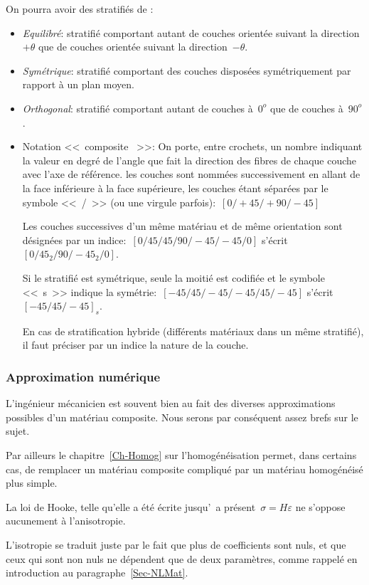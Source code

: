 \medskip
On pourra avoir des stratifiés de :
\begin{itemize}
	\item \emph{Equilibré}: stratifié comportant autant de couches orientée suivant la direction
		$+\theta$ que de couches orientée suivant la direction~$-\theta$.
	\item \emph{Symétrique}: stratifié comportant des couches disposées symétriquement par
		 rapport à un plan moyen.
	\item \emph{Orthogonal}: stratifié comportant autant de couches à~$0^o$ que de couches à~$90^o$.
	\item Notation <<~composite ~>>:
		On porte, entre crochets, un nombre indiquant la valeur en degré de l'angle que fait la direction
		des fibres de chaque couche avec l'axe de référence. les couches sont nommées successivement
		en allant de la face inférieure à la face supérieure, les couches étant séparées par le symbole
		<<~/~>> (ou une virgule parfois):~$[0/+45/+90/-45]$

		Les couches successives d'un même matériau et de même orientation sont désignées
		par un indice:~$[0/45/45/90/-45/-45/0]$ s'écrit~$[0/45_2/90/-45_2/0]$.
		
		Si le stratifié est symétrique, seule la moitié est codifiée et le symbole <<~s~>> indique
		la symétrie:~$[-45/45/-45/-45/45/-45]$ s'écrit~$[-45/45/-45]_s$.

		En cas de stratification hybride (différents matériaux dans un même stratifié), il faut
		préciser par un indice la nature de la couche.
\end{itemize}


\medskip
\subsubsection{Approximation numérique}

L'ingénieur mécanicien est souvent bien au fait des diverses approximations possibles d'un
matériau composite. Nous serons par conséquent assez brefs sur le sujet.

Par ailleurs le chapitre~\ref{Ch-Homog} sur l'homogénéisation permet, dans certains cas, de remplacer
un matériau composite compliqué par un matériau homogénéisé plus simple.

\medskip
La loi de Hooke, telle qu'elle a été écrite jusqu'\ a présent~$\sigma=H\varepsilon$ ne s'oppose
aucunement à l'anisotropie.

L'isotropie se traduit juste par le fait que plus de coefficients sont nuls,
et que ceux qui sont non nuls ne dépendent que de deux paramètres, comme rappelé
en introduction au paragraphe~\ref{Sec-NLMat}.


